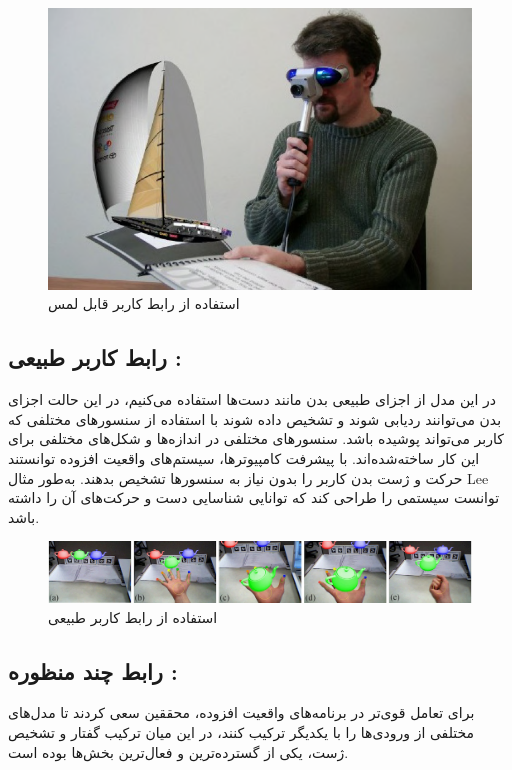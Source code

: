 \begin{figure}[tb]
	\centering
	\includegraphics[width=0.6\linewidth]{image/tar}
	\caption {استفاده از رابط کاربر قابل لمس \cite{Kato}}
	\label{fig:tar}
\end{figure}
\subsection{رابط کاربر طبیعی \protect{} :}
در این مدل از اجزای طبیعی بدن مانند دست‌ها استفاده می‌کنیم، در این حالت اجزای بدن می‌توانند ردیابی شوند و تشخیص داده شوند با استفاده از سنسورهای مختلفی که کاربر می‌تواند پوشیده باشد. سنسورهای مختلفی در اندازه‌ها و شکل‌های مختلفی برای این کار ساخته‌شده‌اند.
با پیشرفت کامپیوترها، سیستم‌های واقعیت افزوده توانستند حرکت و ژست بدن کاربر را بدون نیاز به سنسورها تشخیص بدهند. به‌طور مثال Lee توانست سیستمی را طراحی کند که توانایی شناسایی دست و حرکت‌های آن را داشته باشد\cite{Lee}.
\begin{figure}[!ht]
	\centering
	\includegraphics[width=1\linewidth]{image/handyar}
	\caption {استفاده از رابط کاربر طبیعی \cite{Lee}}
	\label{fig:Bowman}
\end{figure}

\subsection{رابط چند منظوره\protect{} :}
برای تعامل قوی‌تر در برنامه‌های واقعیت افزوده، محققین سعی کردند تا مدل‌های مختلفی از ورودی‌ها را با یکدیگر ترکیب کنند، در این میان ترکیب گفتار و تشخیص ژست، یکی از گسترده‌ترین و فعال‌ترین بخش‌ها بوده است.

